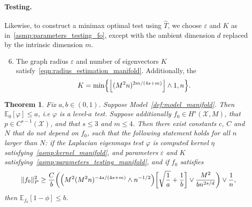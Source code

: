 \documentclass{article}
\newcommand{\floor}[1]{\left\lfloor #1 \right\rfloor}
\newcommand{\1}{\mathbf{1}}
\newcommand{\mc}[1]{\mathcal{#1}}
\newcommand{\Ebb}{\mathbb{E}}
\newcommand{\wh}[1]{\widehat{#1}}
\theoremstyle{alden}
\theoremstyle{aldenthm}
\newtheorem{theorem}{Theorem}
\theoremstyle{definition}
\theoremstyle{remark}
\begin{document}
\paragraph{Testing.}
Likewise, to construct a minimax optimal test using $\wh{T}$, we choose $\varepsilon$ and $K$ as in~\ref{asmp:parameters_testing_fo}, except with the ambient dimension $d$ replaced by the intrinsic dimension $m$.
\begin{enumerate}[label=(P\arabic*)]
	\setcounter{enumi}{5}
	\item 
	\label{asmp:parameters_testing_manifold}
	The graph radius $\varepsilon$ and number of eigenvectors $K$ satisfy~\eqref{eqn:radius_estimation_manifold}. Additionally, the
	\begin{equation*}
	K = \min\Bigl\{\floor{(M^2n)^{2m/(4s + m)}} \wedge 1,n \Bigr\}.
	\end{equation*}
\end{enumerate}

\begin{theorem}
	\label{thm:laplacian_eigenmaps_testing_manifold}
	Fix $a,b \in (0,1)$. Suppose Model~\ref{def:model_manifold}. Then $\mathbb{E}_0[\varphi] \leq a$, i.e $\varphi$ is a level-$a$ test. Suppose additionally $f_0 \in H^s(\mc{X},M)$, that $p \in C^{s-1}(\mc{X})$, and that $s \leq 3$ and $m \leq 4$. Then there exist constants $c$, $C$ and $N$ that do not depend on $f_0$, such that the following statement holds for all $n$ larger than $N$: if the Laplacian eigenmaps test $\varphi$ is computed kernel $\eta$ satisfying~\ref{asmp:kernel_manifold}, and parameters $\varepsilon$ and $K$ satisfying~\ref{asmp:parameters_testing_manifold}, and if $f_0$ satisfies
	\begin{equation}
	\label{eqn:laplacian_eigenmaps_testing_criticalradius_manifold}
	\|f_0\|_P^2 \geq \frac{C}{b}\biggl(\Bigl(M^2(M^2n)^{-4s/(4s + m) } \wedge n^{-1/2}\Bigr)\biggl[\sqrt{\frac{1}{a}} + \frac{1}{b}\biggr] \vee \frac{M^2}{b n^{2s/d}} \biggr) \vee \frac{1}{n},
	\end{equation}
	then $\Ebb_{f_0}[1 - \phi] \leq b$.
\end{theorem}
\end{document}
